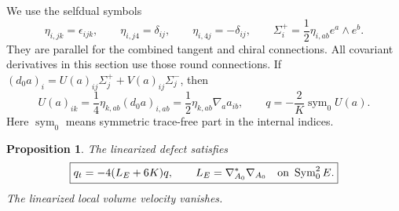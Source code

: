 \documentclass[11pt]{article}
\numberwithin{equation}{section}
\newtheorem{proposition}[theorem]{Proposition}
\theoremstyle{definition}
\theoremstyle{remark}
\begin{document}
We use the selfdual symbols
\begin{equation}
 \eta_{i,jk}=\epsilon_{ijk},\qquad
 \eta_{i,j4}=\delta_{ij},\qquad
 \eta_{i,4j}=-\delta_{ij},\qquad
 \Sigma_i^+=\frac12\eta_{i,ab}e^a\wedge e^b.
 \label{flow:eta-convention}
\end{equation}
They are parallel for the combined tangent and chiral connections.
All covariant derivatives in this section use those round connections.
If $(d_0a)_i=U(a)_{ij}\Sigma_j^++V(a)_{ij}\Sigma_j^-$, then
\begin{equation}
 U(a)_{ik}=\frac14\eta_{k,ab}(d_0a)_{i,ab}
          =\frac12\eta_{k,ab}\nabla_a a_{ib},
 \qquad
 q=-\frac2K\operatorname{sym}_0U(a).
 \label{flow:linear-Q-map}
\end{equation}
Here $\operatorname{sym}_0$ means symmetric trace-free part in the
internal indices.

\begin{proposition}
\label{flow:round-heat}
The linearized defect satisfies
\begin{equation}
 \boxed{q_t=-4(L_E+6K)q,\qquad
 L_E=\nabla_{A_0}^*\nabla_{A_0}
       \quad\hbox{on }\operatorname{Sym}^2_0E.}
 \label{flow:round-defect-heat}
\end{equation}
The linearized local volume velocity vanishes.
\end{proposition}
\end{document}
